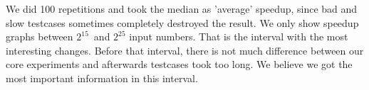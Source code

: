 We did 100 repetitions and took the median as 'average' speedup, since bad and slow testcases sometimes completely destroyed the result. \newline 
We only show speedup graphs between \(2^{15}\)\ and \(2^{25}\) input numbers. That is the interval with the most interesting changes. Before that interval, there is not much difference between our core experiments and afterwards testcases took too long. We believe we got the most important information in this interval.\newline